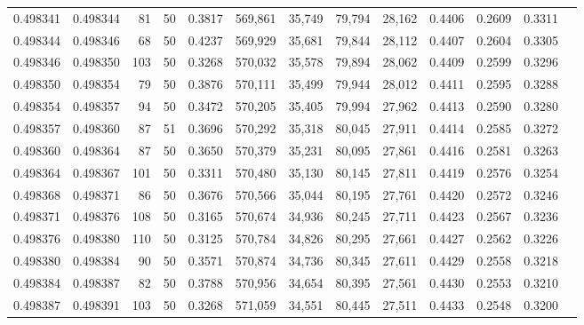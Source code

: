 \begin{tabular}{rrrrrrrrrrrrr}
0.498341 & 0.498344 &    81 &  50 &                                     0.3817 & 569,861 &  35,749 &  79,794 &  28,162 & 0.4406 & 0.2609 & 0.3311 \\
0.498344 & 0.498346 &    68 &  50 &                                     0.4237 & 569,929 &  35,681 &  79,844 &  28,112 & 0.4407 & 0.2604 & 0.3305 \\
0.498346 & 0.498350 &   103 &  50 &                                     0.3268 & 570,032 &  35,578 &  79,894 &  28,062 & 0.4409 & 0.2599 & 0.3296 \\
0.498350 & 0.498354 &    79 &  50 &                                     0.3876 & 570,111 &  35,499 &  79,944 &  28,012 & 0.4411 & 0.2595 & 0.3288 \\
0.498354 & 0.498357 &    94 &  50 &                                     0.3472 & 570,205 &  35,405 &  79,994 &  27,962 & 0.4413 & 0.2590 & 0.3280 \\
0.498357 & 0.498360 &    87 &  51 &                                     0.3696 & 570,292 &  35,318 &  80,045 &  27,911 & 0.4414 & 0.2585 & 0.3272 \\
0.498360 & 0.498364 &    87 &  50 &                                     0.3650 & 570,379 &  35,231 &  80,095 &  27,861 & 0.4416 & 0.2581 & 0.3263 \\
0.498364 & 0.498367 &   101 &  50 &                                     0.3311 & 570,480 &  35,130 &  80,145 &  27,811 & 0.4419 & 0.2576 & 0.3254 \\
0.498368 & 0.498371 &    86 &  50 &                                     0.3676 & 570,566 &  35,044 &  80,195 &  27,761 & 0.4420 & 0.2572 & 0.3246 \\
0.498371 & 0.498376 &   108 &  50 &                                     0.3165 & 570,674 &  34,936 &  80,245 &  27,711 & 0.4423 & 0.2567 & 0.3236 \\
0.498376 & 0.498380 &   110 &  50 &                                     0.3125 & 570,784 &  34,826 &  80,295 &  27,661 & 0.4427 & 0.2562 & 0.3226 \\
0.498380 & 0.498384 &    90 &  50 &                                     0.3571 & 570,874 &  34,736 &  80,345 &  27,611 & 0.4429 & 0.2558 & 0.3218 \\
0.498384 & 0.498387 &    82 &  50 &                                     0.3788 & 570,956 &  34,654 &  80,395 &  27,561 & 0.4430 & 0.2553 & 0.3210 \\
0.498387 & 0.498391 &   103 &  50 &                                     0.3268 & 571,059 &  34,551 &  80,445 &  27,511 & 0.4433 & 0.2548 & 0.3200 \\

\end{tabular}
